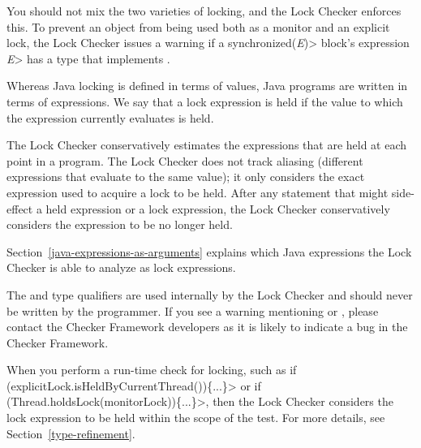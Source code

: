 You should not mix the two varieties of locking, and the Lock Checker
enforces this.  To prevent an object from being used both as a monitor and
an explicit lock, the Lock Checker issues a warning if a
\<synchronized(\emph{E})> block's expression \<\emph{E}> has a type that
implements .



Whereas Java locking is defined in terms of values, Java programs are
written in terms of expressions.
We say that a lock expression is held if the value to which the expression
currently evaluates is held.

The Lock Checker conservatively estimates the expressions that are held at
each point in a program.
The Lock Checker does not track aliasing
(different expressions that evaluate to the same value); it only considers
the exact expression used to acquire a lock to be held.  After any statement
that might side-effect a held expression or a lock expression, the Lock
Checker conservatively considers the expression to be no longer held.

Section~\ref{java-expressions-as-arguments} explains which Java
expressions the Lock Checker is able to analyze as lock expressions.


The  and  type qualifiers are used internally by the Lock Checker
and should never be written by the programmer.
If you
see a warning mentioning  or ,
please contact the Checker Framework developers as it is likely to
indicate a bug in the Checker Framework.



When you perform a run-time check for locking, such as
\<if (explicitLock.isHeldByCurrentThread())\{...\}> or
\<if (Thread.holdsLock(monitorLock))\{...\}>,
then the Lock Checker considers the lock expression to be held
within the scope of the test.  For more details, see
Section~\ref{type-refinement}.




